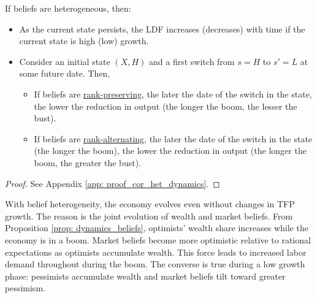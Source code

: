 \begin{corollary}\label{cor:het_dynamics} If beliefs are heterogeneous, then:

\begin{itemize}
    \item As the current state persists, the LDF increases (decreases) with time if the current state is high (low) growth.
    \item Consider an initial state $(X,H)$ and a first switch from $s=H$ to $s'=L$ at some future date. Then,
\begin{itemize}
\item If beliefs are \underline{rank-preserving}, the later the date of the switch in the state, the lower the reduction in output (the longer the boom, the lesser the bust). 

\item  If beliefs are \underline{rank-alternating}, the later the date of the switch in the state (the longer the boom), the lower the reduction in output  (the longer the boom, the greater the bust).
\end{itemize}
\end{itemize}

\end{corollary}
\begin{proof}
See Appendix \ref{app: proof_cor_het_dynamics}.
\end{proof}
With belief heterogeneity, the economy evolves even without changes in TFP growth. The reason is the joint evolution of wealth and market beliefs. From Proposition \ref{prop: dynamics_beliefs}, optimists' wealth share increases while the economy is in a boom. Market beliefs become more optimistic relative to rational expectations as optimists accumulate wealth. This force leads to increased labor demand throughout during the boom. The converse is true during a low growth phase: pessimists accumulate wealth and market beliefs tilt toward greater pessimism.

